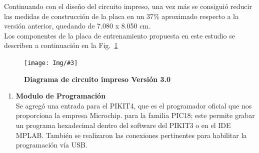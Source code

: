 \documentclass[times, 10pt,twocolumn]{article}
\newcommand{\Img}[5]{
   \begin{figure}[H]
   	   \centering
       \texttt{[image: Img/\#3]}
       \caption{ \centering \textbf{\small #4}}
       \label{#5}
       \end{figure}
   }
\begin{document}
Continuando con el diseño del circuito impreso, una vez más se consiguió reducir las medidas de construcción de la placa en un 37\% aproximado respecto a la versión anterior, quedando de 7.080 x 8.050 cm. \\ 
Los componentes de la placa de entrenamiento propuesta en este estudio se describen a continuación en la Fig.~\ref{fig:10}

\Img{7.5cm}{7.0cm}{tercera_version_pcb}{Diagrama de circuito impreso Versión 3.0}{fig:10}
\begin{enumerate}[label=\emph{\Alph*.}] 
  \item \textbf{Modulo de Programación}\\ Se agregó una entrada para el PIKIT4, que es el programador oficial que nos proporciona la empresa Microchip. para la familia PIC18; este permite grabar un programa hexadecimal dentro del software del PIKIT3 o en el IDE MPLAB. También se realizaron las conexiones pertinentes para habilitar la  programación vía USB.
 

\end{enumerate}
\end{document}
